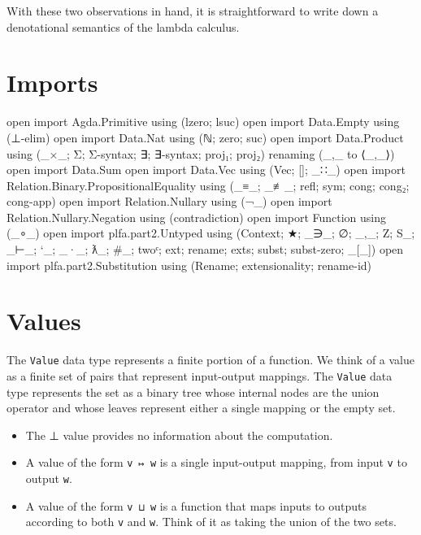 With these two observations in hand, it is straightforward to write down
a denotational semantics of the lambda calculus.

\hypertarget{imports}{%
\section{Imports}\label{imports}}

\begin{fence}
\begin{code}
open import Agda.Primitive using (lzero; lsuc)
open import Data.Empty using (⊥-elim)
open import Data.Nat using (ℕ; zero; suc)
open import Data.Product using (_×_; Σ; Σ-syntax; ∃; ∃-syntax; proj₁; proj₂)
  renaming (_,_ to ⟨_,_⟩)
open import Data.Sum
open import Data.Vec using (Vec; []; _∷_)
open import Relation.Binary.PropositionalEquality
  using (_≡_; _≢_; refl; sym; cong; cong₂; cong-app)
open import Relation.Nullary using (¬_)
open import Relation.Nullary.Negation using (contradiction)
open import Function using (_∘_)
open import plfa.part2.Untyped
  using (Context; ★; _∋_; ∅; _,_; Z; S_; _⊢_; `_; _·_; ƛ_;
         #_; twoᶜ; ext; rename; exts; subst; subst-zero; _[_])
open import plfa.part2.Substitution using (Rename; extensionality; rename-id)
\end{code}
\end{fence}

\hypertarget{values}{%
\section{Values}\label{values}}

The \texttt{Value} data type represents a finite portion of a function.
We think of a value as a finite set of pairs that represent input-output
mappings. The \texttt{Value} data type represents the set as a binary
tree whose internal nodes are the union operator and whose leaves
represent either a single mapping or the empty set.

\begin{itemize}
\item
  The ⊥ value provides no information about the computation.
\item
  A value of the form \texttt{v\ ↦\ w} is a single input-output mapping,
  from input \texttt{v} to output \texttt{w}.
\item
  A value of the form \texttt{v\ ⊔\ w} is a function that maps inputs to
  outputs according to both \texttt{v} and \texttt{w}. Think of it as
  taking the union of the two sets.
\end{itemize}


